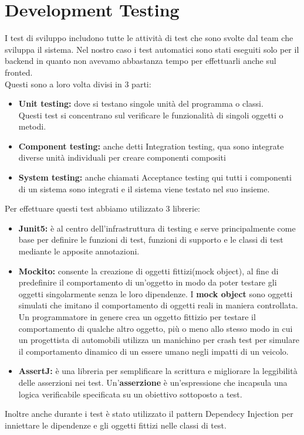 \documentclass[a4paper,12pt,openany,oneside]{book}
\begin{document}
\section{Development Testing}
I test di sviluppo includono tutte le attività di test che sono svolte dal team che sviluppa il sistema. Nel nostro caso i test automatici sono stati eseguiti solo per il backend in quanto non avevamo abbastanza tempo per effettuarli anche sul fronted.\\
Questi sono a loro volta divisi in 3 parti:
\begin{itemize}
  \item \textbf{Unit testing: }dove si testano singole unità del programma o classi.\\Questi test si concentrano sul verificare le funzionalità di singoli oggetti o metodi.
  \item \textbf{Component testing: }anche detti Integration testing, qua sono integrate diverse unità individuali per creare componenti compositi
    \item \textbf{System testing: }anche chiamati Acceptance testing qui tutti i componenti di un sistema sono integrati e il sistema viene testato nel suo insieme.
\end{itemize}
Per effettuare questi test abbiamo utilizzato 3 librerie:
\begin{itemize}
  \item \textbf{Junit5: }è al centro dell'infrastruttura di testing e serve principalmente come base per definire le funzioni di test, funzioni di supporto e le classi di test mediante le apposite annotazioni.
  \item \textbf{Mockito: }consente la creazione di oggetti fittizi(mock object), al fine di predefinire il comportamento di un'oggetto in modo da poter testare gli oggetti singolarmente senza le loro dipendenze.
    I \textbf{mock object} sono oggetti simulati che imitano il comportamento di oggetti reali in maniera controllata. Un programmatore in genere crea un oggetto fittizio per testare il comportamento di qualche altro oggetto, più o meno allo stesso modo in cui un progettista di automobili utilizza un manichino per crash test per simulare il comportamento dinamico di un essere umano negli impatti di un veicolo.
    \item \textbf{AssertJ: } è una libreria per semplificare la scrittura e migliorare la leggibilità delle asserzioni nei test. 
    Un'\textbf{asserzione} è un'espressione che incapsula una logica verificabile specificata su un obiettivo sottoposto a test.
\end{itemize}
Inoltre anche durante i test è stato utilizzato il pattern Dependecy Injection per inniettare le dipendenze e gli oggetti fittizi nelle classi di test.
\end{document}
